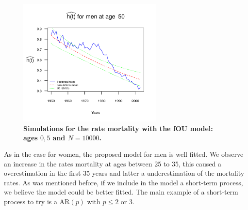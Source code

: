 \documentclass[smallextended]{svjour3}
\begin{document}
\begin{figure}[H]
    \includegraphics[width = 2.85in]{PlotMen50.png}
    \caption{\bf Simulations for the rate mortality with the fOU model: ages
    $0,5$ and $N=10000$.}
    \label{graph-simu_FOU3}
\end{figure}\vspace*{0.1cm}

As in the case for women, the proposed model for men is well fitted.
We observe an increase in the rates mortality at ages between 25 to 35, this
caused a overestimation in the first 35 years and latter a underestimation
of the mortality rates. As was mentioned before, if we include in the model a
short-term process,  we believe the model could be better fitted. The main
example  of a short-term process to try is a AR$(p)$ with $p\le 2$ or $3$.
\end{document}
